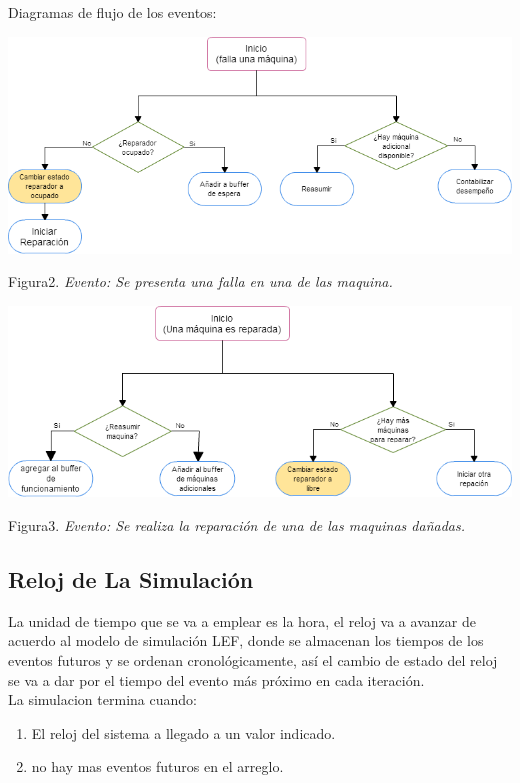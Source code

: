 \documentclass[10pt]{article}
\begin{document}
Diagramas de flujo de los eventos:
\begin{center}

\includegraphics[scale=0.47]{fallaMaquina.png}

Figura2. \emph{Evento: Se presenta una falla en una de las maquina.}
\end{center}
\begin{center}

\includegraphics[scale=0.47]{reparar.png}

Figura3. \emph{Evento: Se realiza la reparación de una de las maquinas dañadas.}
\end{center}



\subsection{Reloj de La Simulación}

La unidad de tiempo que se va a emplear es la hora, el reloj va a avanzar de acuerdo al modelo de simulación LEF, donde se almacenan los tiempos de los eventos futuros y se ordenan cronológicamente, así el cambio de estado del reloj  se va a dar por el tiempo del evento más próximo en cada iteración.\\

La simulacion termina cuando:
\begin{enumerate}
\item El reloj del sistema a llegado a un valor indicado.
\item no hay mas eventos futuros en el arreglo.
\end{enumerate}
\end{document}
